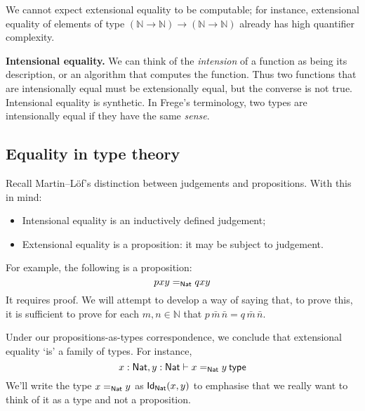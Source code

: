 \documentclass[12pt]{article}
\begin{document}
We cannot expect extensional equality to be computable; for instance, extensional equality of elements of type $(\mathbb{N} \to \mathbb{N}) \to (\mathbb{N} \to \mathbb{N})$ already has high quantifier complexity.

\textbf{Intensional equality.} We can think of the \emph{intension} of a function as being its description, or an algorithm that computes the function. Thus two functions that are intensionally equal must be extensionally equal, but the converse is not true. Intensional equality is synthetic. In Frege's terminology, two types are intensionally equal if they have the same \emph{sense}.

\subsection{Equality in type theory}
Recall Martin--L\"{o}f's distinction between judgements and propositions. With this in mind:
\begin{itemize}
\item Intensional equality is an inductively defined judgement;
\item Extensional equality is a proposition: it may be subject to judgement.
\end{itemize}
For example, the following is a proposition:
\begin{equation*}
pxy =_{\mathsf{Nat}} qxy
\end{equation*}
It requires proof. We will attempt to develop a way of saying that, to prove this, it is sufficient to prove for each $m,n \in \mathbb{N}$ that $p\, \bar m\, \bar n = q\, \bar m\, \bar n$.

Under our propositions-as-types correspondence, we conclude that extensional equality `is' a family of types. For instance,
\begin{equation} \label{eq:equalityAsType}
x : \Nat, y : \Nat \vdash x =_{\Nat} y \type
\end{equation}
We'll write the type $x =_{\mathsf{Nat}} y$ as $\mathsf{Id}_{\mathsf{Nat}}(x,y)$ to emphasise that we really want to think of it as a type and not a proposition.
\end{document}
